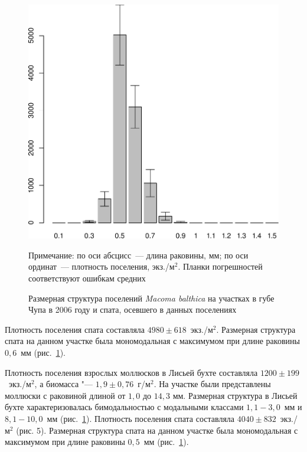 \begin{figure}[p]
\begin{minipage}[b]{.49\linewidth}
\begin{center}
	\end{center}
	\end{minipage}
%
	\hfil %
%
	\begin{minipage}[b]{.49\linewidth}
	\begin{center}	
		\includegraphics[width=0.215\textheight]{../White_Sea/spat/spat_str_Podpahta_1.pdf}
	\end{center}
	\end{minipage}
		\caption{Размерная структура поселений {\it Macoma balthica} на участках в губе Чупа в 2006 году и спата, осевшего в данных поселениях}
		\label{ris:Chupa_spat_sizestr}
\footnotesize{Примечание: по оси абсцисс~--- длина раковины, мм; по оси ординат~--- плотность поселения, экз./м$^2$. Планки погрешностей соответствуют ошибкам средних}
	\end{figure}
Плотность поселения спата составляла $4980 \pm 618$~экз./м$^2$. 
Размерная структура спата на данном участке была мономодальная с максимумом при длине раковины $0,6$~мм (рис.~\ref{ris:Chupa_spat_sizestr}).

Плотность поселения взрослых моллюсков в Лисьей бухте составляла $1200 \pm 199$~экз./м$^2$, а биомасса "--- $1,9 \pm 0,76$~г/м$^2$. 
На участке были представлены моллюски с раковиной длиной от $1,0$ до $14,3$ мм. 
Размерная структура в Лисьей бухте характеризовалась бимодальностью с модальными классами $1,1 - 3,0$~мм и $8,1 - 10,0$~мм (рис.~\ref{ris:Chupa_spat_sizestr}). 
Плотность поселения спата составляла $4040 \pm 832$~экз./м$^2$ (рис. 5). 
Размерная структура спата на данном участке была мономодальная с максимумом при длине раковины $0,5$~мм (рис.~\ref{ris:Chupa_spat_sizestr}).

